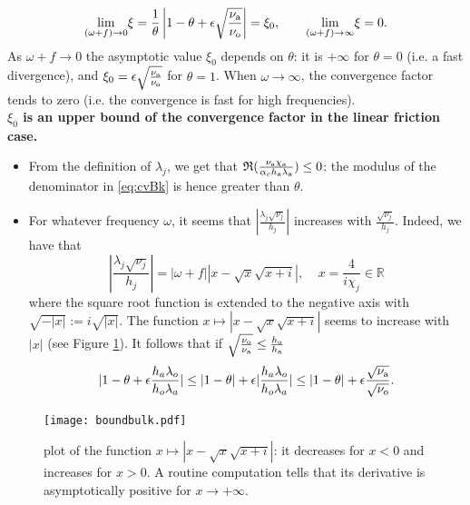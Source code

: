 \[
 \underset{(\omega+f) \rightarrow 0}{\mathrm{lim}} \xi = \frac{1}{\theta} \left| 1-\theta+\epsilon \sqrt{\frac{\nu_{\rm a}}{\nu_{\rm o}}}  \right| = \xi_0, \qquad
 \underset{(\omega+f) \rightarrow \infty}{\mathrm{lim}} \xi = 0.
\]
As $\omega + f \to 0$ the asymptotic value 
$\xi_0$ depends on $\theta$: it is $+\infty$ for $\theta=0$ (i.e. a fast divergence), and $\xi_0 = \epsilon\sqrt{\frac{\nu_{\rm a}}{\nu_{\rm o}}}$ for $\theta=1$.
When $\omega\to \infty$, the convergence factor tends to zero 
(i.e. the convergence is fast for high frequencies).
\\[3mm]
\textbf{$\xi_0$ is an upper bound of the convergence factor in the linear friction case.}\hspace*{5mm} %
\begin{itemize}
    \item From the definition of $\lambda_j$, we get that $\mathfrak{R}(\frac{\nu_{\rm a}\chi_{\rm a}}{\alpha_c h_{\rm a} \lambda_{\rm a}}) \leq 0$: the modulus of the denominator in \eqref{eq:cvBk} is hence greater than $\theta$.
    \item For whatever frequency $\omega$, it seems that $\left|\frac{\lambda_j \sqrt{\nu_j}}{h_j}\right|$ increases with $\frac{\sqrt{\nu_j}}{h_j}$.
    Indeed, we have that
	\begin{equation}
	\left|\frac{\lambda_j \sqrt{\nu_j}}{h_j}\right|
		= |\omega + f| |x - \sqrt{x}\sqrt{x+i}|,
		~~~~~ x = \frac{4}{i \chi_j} \in \mathbb{R}
	\end{equation}
	where the square root function is extended to the
		negative axis with $\sqrt{-|x|} := i\sqrt{|x|}$.
	The function $x \mapsto |x - \sqrt{x}\sqrt{x+i}|$
		seems to increase with $|x|$
    (see Figure \ref{fig:figboundbulk}). It follows that if
	$\sqrt{\frac{\nu_{\rm o}}{\nu_{\rm a}}} \leq
		\frac{h_{\rm o}}{h_{\rm a}}$
\begin{equation}
    |1-\theta+\epsilon \frac{h_a \lambda_o}{h_o \lambda_a}| \leq | 1 - \theta| + \epsilon |\frac{h_a \lambda_o}{h_o \lambda_a}| \leq 
    |1 - \theta| + \epsilon \frac{\sqrt{\nu_{\rm a}}}{\sqrt{\nu_{\rm o}}}.
\end{equation}
\end{itemize}
\begin{figure}
    \centering
    \texttt{[image: boundbulk.pdf]}
    \caption{plot of the function $x \mapsto |x - \sqrt{x}\sqrt{x+i}|$:
	 it decreases for $x<0$ and increases for $x>0$. A routine
	 computation tells that its derivative is asymptotically
	 positive for $x\rightarrow+\infty$.
	 }
    \label{fig:figboundbulk}
\end{figure}
